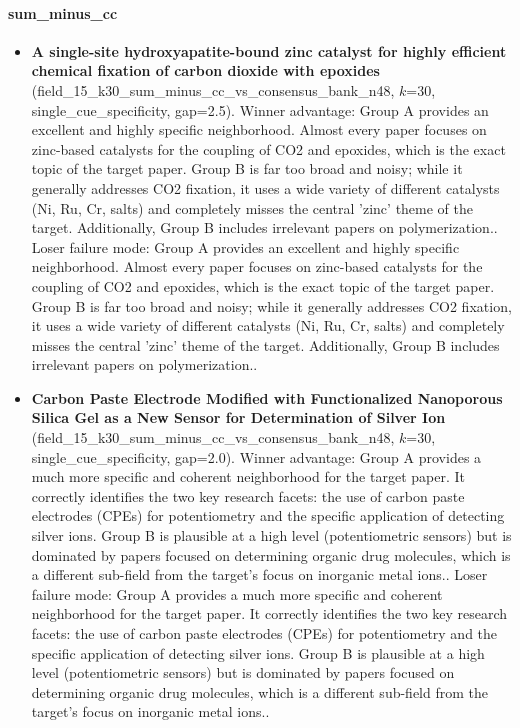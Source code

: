 \paragraph{sum\_minus\_cc}
\begin{itemize}
\item \textbf{A single-site hydroxyapatite-bound zinc catalyst for highly efficient chemical fixation of carbon dioxide with epoxides} (field\_15\_k30\_sum\_minus\_cc\_vs\_consensus\_bank\_n48, $k$=30, single\_cue\_specificity, gap=2.5). Winner advantage: Group A provides an excellent and highly specific neighborhood. Almost every paper focuses on zinc-based catalysts for the coupling of CO2 and epoxides, which is the exact topic of the target paper. Group B is far too broad and noisy; while it generally addresses CO2 fixation, it uses a wide variety of different catalysts (Ni, Ru, Cr, salts) and completely misses the central 'zinc' theme of the target. Additionally, Group B includes irrelevant papers on polymerization.. Loser failure mode: Group A provides an excellent and highly specific neighborhood. Almost every paper focuses on zinc-based catalysts for the coupling of CO2 and epoxides, which is the exact topic of the target paper. Group B is far too broad and noisy; while it generally addresses CO2 fixation, it uses a wide variety of different catalysts (Ni, Ru, Cr, salts) and completely misses the central 'zinc' theme of the target. Additionally, Group B includes irrelevant papers on polymerization..
\item \textbf{Carbon Paste Electrode Modified with Functionalized Nanoporous Silica Gel as a New Sensor for Determination of Silver Ion} (field\_15\_k30\_sum\_minus\_cc\_vs\_consensus\_bank\_n48, $k$=30, single\_cue\_specificity, gap=2.0). Winner advantage: Group A provides a much more specific and coherent neighborhood for the target paper. It correctly identifies the two key research facets: the use of carbon paste electrodes (CPEs) for potentiometry and the specific application of detecting silver ions. Group B is plausible at a high level (potentiometric sensors) but is dominated by papers focused on determining organic drug molecules, which is a different sub-field from the target's focus on inorganic metal ions.. Loser failure mode: Group A provides a much more specific and coherent neighborhood for the target paper. It correctly identifies the two key research facets: the use of carbon paste electrodes (CPEs) for potentiometry and the specific application of detecting silver ions. Group B is plausible at a high level (potentiometric sensors) but is dominated by papers focused on determining organic drug molecules, which is a different sub-field from the target's focus on inorganic metal ions..

\end{itemize}
